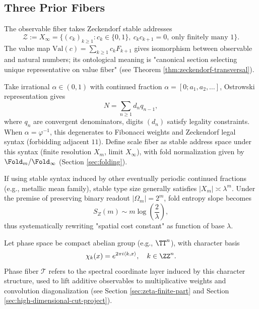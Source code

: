 \subsection{Three Prior Fibers}\label{subsec:pom-fibers}
\begin{definition}\label{def:pom-observable-fiber}
The observable fiber takes Zeckendorf stable addresses
\[
\mathcal Z:=X_\infty=\{(c_k)_{k\ge 1}: c_k\in\{0,1\},\ c_kc_{k+1}=0,\ \text{only finitely many }1\}.
\]
The value map $\mathrm{Val}(c)=\sum_{k\ge 1}c_kF_{k+1}$ gives isomorphism between observable and natural numbers; its ontological meaning is "canonical section selecting unique representative on value fiber" (see Theorem \ref{thm:zeckendorf-transversal}).
\end{definition}

\begin{definition}\label{def:pom-scale-fiber}
Take irrational $\alpha\in(0,1)$ with continued fraction $\alpha=[0;a_1,a_2,\dots]$, Ostrowski representation gives
\[
N=\sum_{n\ge 1} d_n q_{n-1},
\]
where $q_n$ are convergent denominators, digits $(d_n)$ satisfy legality constraints. When $\alpha=\varphi^{-1}$, this degenerates to Fibonacci weights and Zeckendorf legal syntax (forbidding adjacent $11$). Define scale fiber as stable address space under this syntax (finite resolution $X_m$, limit $X_\infty$), with fold normalization given by $\Fold_m/\Fold_\infty$ (Section \ref{sec:folding}).
\end{definition}

\begin{remark}\label{rem:pom-scale-slope}
If using stable syntax induced by other eventually periodic continued fractions (e.g., metallic mean family), stable type size generally satisfies $|X_m|\asymp \lambda^m$. Under the premise of preserving binary readout $|\Omega_m|=2^m$, fold entropy slope becomes
\[
S_Z(m)\sim m\log\!\left(\frac{2}{\lambda}\right),
\]
thus systematically rewriting "spatial cost constant" as function of base $\lambda$.
\end{remark}

\begin{definition}\label{def:pom-phase-fiber}
Let phase space be compact abelian group (e.g., $\TT^n$), with character basis
\[
\chi_k(x)=e^{2\pi i\langle k,x\rangle},\quad k\in\ZZ^n.
\]
Phase fiber $\mathcal{T}$ refers to the spectral coordinate layer induced by this character structure, used to lift additive observables to multiplicative weights and convolution diagonalization (see Section \ref{sec:zeta-finite-part} and Section \ref{sec:high-dimensional-cut-project}).
\end{definition}

